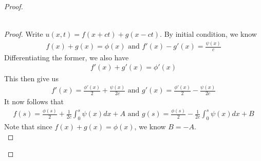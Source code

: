 \documentclass{report}
\begin{document}
\begin{proof}
\begin{theorem}
\begin{align*}
\end{align*}
\end{theorem}
\begin{proof}
Write $u(x,t)=f(x+ct)+g(x-ct)$. By initial condition, we know 
\begin{align*}
f(x)+g(x)=\phi (x)\text{ and }f'(x)-g'(x)= \frac{\psi (x)}{c}
\end{align*}
Differentiating the former, we also have 
\begin{align*}
f'(x)+g'(x)=\phi' (x)
\end{align*}
This then give us 
\begin{align*}
f'(x)= \frac{\phi '(x)}{2} + \frac{\psi (x)}{2c}\text{ and }g'(x)= \frac{\phi '(x)}{2}- \frac{\psi (x)}{2c}
\end{align*}
It now follows that 
\begin{align*}
f(s)=\frac{\phi (s)}{2}+ \frac{1}{2c}\int_0^s \psi (x)dx +A \text{ and }g(s)= \frac{\phi (s)}{2} - \frac{1}{2c} \int_0^s \psi (x)dx + B
\end{align*}
Note that since $f(x)+g(x)=\phi (x)$, we know $B=-A$. \\


\end{proof}
\end{proof}
\end{document}

